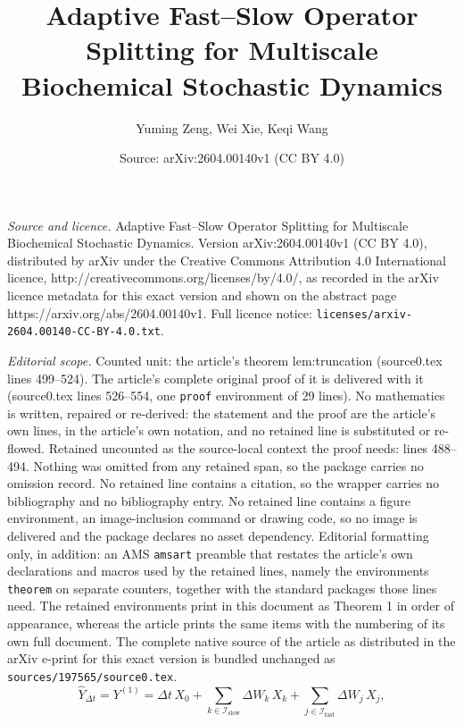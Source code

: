 \documentclass[10pt,a4paper]{amsart}
\title{\Large Adaptive Fast–Slow Operator Splitting for Multiscale Biochemical Stochastic Dynamics}
\author{Yuming Zeng, Wei Xie, Keqi Wang}
\date{Source: arXiv:2604.00140v1 (CC BY 4.0)}
\begin{document}
\maketitle

\noindent\emph{Source and licence.} \Large Adaptive Fast–Slow Operator Splitting for Multiscale Biochemical Stochastic Dynamics. Version arXiv:2604.00140v1 (CC BY 4.0), distributed by arXiv under the Creative Commons Attribution 4.0 International licence, http://creativecommons.org/licenses/by/4.0/, as recorded in the arXiv licence metadata for this exact version and shown on the abstract page https://arxiv.org/abs/2604.00140v1. Full licence notice: \texttt{licenses/arxiv-2604.00140-CC-BY-4.0.txt}.\par\smallskip

\noindent\textit{Editorial scope.} Counted unit: the article's theorem lem:truncation (source0.tex lines 499--524). The article's complete original proof of it is delivered with it (source0.tex lines 526--554, one \texttt{proof} environment of 29 lines). No mathematics is written, repaired or re-derived: the statement and the proof are the article's own lines, in the article's own notation, and no retained line is substituted or re-flowed.  Retained uncounted as the source-local context the proof needs: lines 488--494.  Nothing was omitted from any retained span, so the package carries no omission record.  No retained line contains a citation, so the wrapper carries no bibliography and no bibliography entry.  No retained line contains a figure environment, an image-inclusion command or drawing code, so no image is delivered and the package declares no asset dependency.  Editorial formatting only, in addition: an AMS \texttt{amsart} preamble that restates the article's own declarations and macros used by the retained lines, namely the environments \texttt{theorem} on separate counters, together with the standard packages those lines need.  The retained environments print in this document as Theorem 1 in order of appearance, whereas the article prints the same items with the numbering of its own full document.  The complete native source of the article as distributed in the arXiv e-print for this exact version is bundled unchanged as \texttt{sources/197565/source0.tex}.
\begin{equation}
\label{formula:truncate}
    \hat{Y}_{\Delta t} = Y^{(1)}
= \Delta t\,X_0
+ \sum_{k\in\mathcal{I}_{\mathrm{slow}}} \Delta W_k\,X_k
+ \sum_{j\in\mathcal{I}_{\mathrm{fast}}} \Delta W_j\,X_j,
\end{equation}
\end{document}
